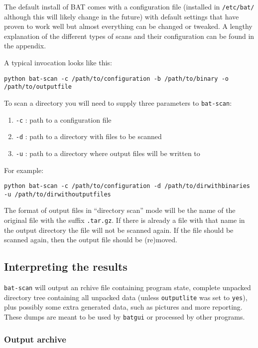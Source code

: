 \documentclass[10pt,a4paper]{article}
\begin{document}
The default install of BAT comes with a configuration file (installed in
\texttt{/etc/bat/} although this will likely change in the future) with default
settings that have proven to work well but almost everything can be changed or
tweaked. A lengthy explanation of the different types of scans and their
configuration can be found in the appendix.

A typical invocation looks like this:

\begin{verbatim}
python bat-scan -c /path/to/configuration -b /path/to/binary -o
/path/to/outputfile
\end{verbatim}

To scan a directory you will need to supply three parameters to
\texttt{bat-scan}:

\begin{enumerate}
\item \texttt{-c} : path to a configuration file
\item \texttt{-d} : path to a directory with files to be scanned
\item \texttt{-u} : path to a directory where output files will be written to
\end{enumerate}

For example:

\begin{verbatim}
python bat-scan -c /path/to/configuration -d /path/to/dirwithbinaries
-u /path/to/dirwithoutputfiles
\end{verbatim}

The format of output files in ``directory scan'' mode will be the name of the
original file with the suffix \texttt{.tar.gz}. If there is already a file with
that name in the output directory the file will not be scanned again. If the
file should be scanned again, then the output file should be (re)moved.

\subsection{Interpreting the results}

\texttt{bat-scan} will output an rchive file containing program state, complete
unpacked directory tree containing all unpacked data (unless \texttt{outputlite}
was set to \texttt{yes}), plus possibly some extra generated data, such as
pictures and more reporting. These dumps are meant to be used by
\texttt{batgui} or processed by other programs.

\subsubsection{Output archive}
\end{document}

